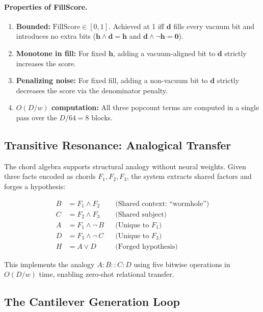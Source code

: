 \paragraph{Properties of FillScore.}
\begin{enumerate}[nosep]
  \item \textbf{Bounded:} $\text{FillScore} \in [0, 1]$.
        Achieved at 1 iff $\mathbf{d}$ fills every vacuum bit and introduces
        no extra bits ($\mathbf{h} \land \mathbf{d} = \mathbf{h}$ and
        $\mathbf{d} \land \lnot\mathbf{h} = \mathbf{0}$).
  \item \textbf{Monotone in fill:}  For fixed $\mathbf{h}$, adding a
        vacuum-aligned bit to $\mathbf{d}$ strictly increases the score.
  \item \textbf{Penalizing noise:}  For fixed fill, adding a non-vacuum bit
        to $\mathbf{d}$ strictly decreases the score via the denominator
        penalty.
  \item \textbf{$O(D/w)$ computation:}  All three popcount terms are
        computed in a single pass over the $D/64 = 8$ blocks.
\end{enumerate}

\subsection{Transitive Resonance: Analogical Transfer}
\label{sec:transitive_resonance}

The chord algebra supports structural analogy without neural weights.
Given three facts encoded as chords $F_1, F_2, F_3$, the system
extracts shared factors and forges a hypothesis:

\begin{align}
  B &= F_1 \land F_2 && \text{(Shared context: ``wormhole'')} \label{eq:tr_b} \\
  C &= F_2 \land F_3 && \text{(Shared subject)} \label{eq:tr_c} \\
  A &= F_1 \land \lnot\,B && \text{(Unique to } F_1 \text{)} \label{eq:tr_a} \\
  D &= F_3 \land \lnot\,C && \text{(Unique to } F_3 \text{)} \label{eq:tr_d} \\
  H &= A \lor D && \text{(Forged hypothesis)} \label{eq:tr_h}
\end{align}

\noindent This implements the analogy $A : B :: C : D$ using five bitwise
operations in $O(D/w)$ time, enabling zero-shot relational transfer.

\subsection{The Cantilever Generation Loop}
\label{sec:cantilever}

